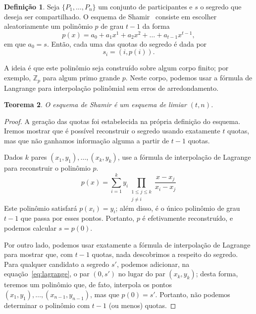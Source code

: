 \documentclass[10pt,twocolumn]{article}
\newtheorem{theorem}{Teorema}
\theoremstyle{definition}
\newtheorem{definition}[theorem]{Definição}
\begin{document}
\begin{definition}
    Seja $\{P_1, \dots, P_n\}$ um conjunto de participantes
    e $s$ o segredo que deseja ser compartilhado.
    O esquema de Shamir~\cite{Shamir1979}
    consiste em escolher aleatoriamente um polinômio $p$
    de grau $t-1$
    da forma
    \begin{equation*}
        p(x) = a_0 + a_1 x^1 + a_2 x^2 + \dots + a_{t-1} x^{t-1},
    \end{equation*}
    em que $a_0 = s$.
    Então, cada uma das quotas do segredo é dada por
    \begin{equation*}
        s_i = (i, p(i)).
    \end{equation*}
\end{definition}

A ideia é que este polinômio seja construído sobre algum corpo finito;
por exemplo, $\mathbb Z_p$ para algum primo grande $p$.
Neste corpo,
podemos usar a fórmula de Langrange para interpolação polinômial
sem erros de arredondamento.

\begin{theorem}
    O esquema de Shamir é um esquema de limiar $(t, n)$.
\end{theorem}

\begin{proof}
    A geração das quotas foi estabelecida na própria definição do esquema.
    Iremos mostrar que é possível reconstruir o segredo
    usando exatamente $t$ quotas,
    mas que não ganhamos informação alguma a partir de $t-1$ quotas.

    Dados $k$ pares $(x_1, y_1), \dots, (x_k, y_k)$,
    use a fórmula de interpolação de Lagrange para reconstruir o polinômio $p$.
    \begin{equation}
        p(x) = \sum_{i = 1}^k y_i
                \prod_{\begin{smallmatrix}1 \leq j \leq k\\j \neq i\end{smallmatrix}}
                    \frac{x - x_j}{x_i - x_j}
        \label{eq:lagrange}
    \end{equation}
    Este polinômio satisfará $p(x_i) = y_i$;
    além disso, é o único polinômio de grau $t-1$ que passa por esses pontos.
    Portanto,
    $p$ é efetivamente reconstruído,
    e podemos calcular $s = p(0)$.

    Por outro lado,
    podemos usar exatamente a fórmula de interpolação de Lagrange
    para mostrar que, com $t-1$ quotas,
    nada descobrimos a respeito do segredo.
    Para qualquer candidato a segredo $s'$,
    podemos adicionar, na equação~\ref{eq:lagrange},
    o par $(0, s')$
    no lugar do par $(x_k, y_k)$;
    desta forma,
    teremos um polinômio que,
    de fato,
    interpola os pontos $(x_1, y_1), \dots, (x_{n-1}, y_{n-1})$,
    mas que $p(0) = s'$.
    Portanto,
    não podemos determinar o polinômio com $t-1$
    (ou menos)
    quotas.
\end{proof}
\end{document}
